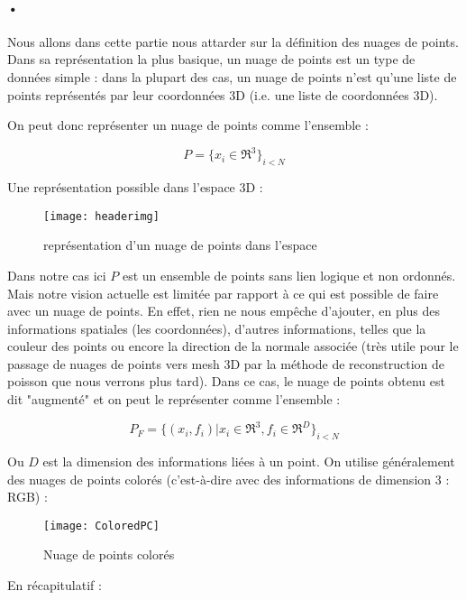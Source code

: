 \paragraph{•} Nous allons dans cette partie nous attarder sur la définition des nuages de points. Dans sa représentation la plus basique, un nuage de points est un type de données simple : dans la plupart des cas, un nuage de points n'est qu'une liste de points représentés par leur coordonnées 3D (i.e. une liste de coordonnées 3D).

On peut donc représenter un nuage de points comme l'ensemble :

\[ P = \{ x_{i} \in \Re^{3} \}_{i<N} \]

\newpage

Une représentation possible dans l'espace 3D :

\begin{figure}[h]
    \centering
    \texttt{[image: headerimg]}
    \caption{représentation d'un nuage de points dans l'espace}
    \label{fig:pointCloud1}
\end{figure}
\FloatBarrier

Dans notre cas ici $P$ est un ensemble de points sans lien logique et non ordonnés.
Mais notre vision actuelle est limitée par rapport à ce qui est possible de faire avec un nuage de points. En effet, rien ne nous empêche d'ajouter, en plus des informations spatiales (les coordonnées), d'autres informations, telles que la couleur des points ou encore la direction de la normale associée (très utile pour le passage de nuages de points vers mesh 3D par la méthode de reconstruction de poisson que nous verrons plus tard). Dans ce cas, le nuage de points obtenu est dit "augmenté" et on peut le représenter comme l'ensemble :

\[ P_{F} = \{ (x_{i}, f_{i}) | x_{i} \in \Re^{3}, f_{i} \in \Re^{D} \}_{i<N} \]

Ou $D$ est la dimension des informations liées à un point.
On utilise généralement des nuages de points colorés (c'est-à-dire avec des informations de dimension 3 : RGB) :

\begin{figure}[h]
    \centering
    \texttt{[image: ColoredPC]}
    \caption{Nuage de points colorés}
    \label{fig:pointCloud2}
\end{figure}
\FloatBarrier


\newpage
En récapitulatif :

